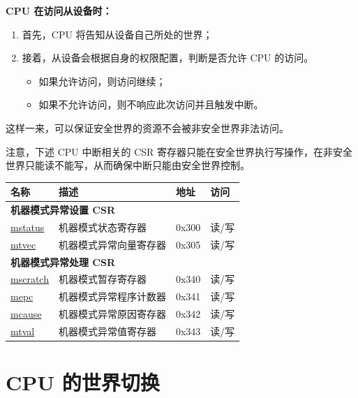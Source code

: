 \documentclass[main\_\_CN.tex]{subfiles}
\begin{document}
\textbf{CPU 在访问从设备时：}

\begin{enumerate}
    \item 首先，CPU 将告知从设备自己所处的世界；
    \item 接着，从设备会根据自身的权限配置，判断是否允许 CPU 的访问。
        \begin{itemize}
        \item 如果允许访问，则访问继续；
        \item 如果不允许访问，则不响应此次访问并且触发中断。
        \end{itemize}
\end{enumerate}
这样一来，可以保证安全世界的资源不会被非安全世界非法访问。

注意，下述 CPU 中断相关的 CSR 寄存器只能在安全世界执行写操作，在非安全世界只能读不能写，从而确保中断只能由安全世界控制。
\begin{table}[H]
    \centering
    \begin{tabular}[c]{ | l | l | l | l | }
    \hline\rowcolor{lightgray}
    \textbf{名称} & \textbf{描述} & \textbf{地址} & \textbf{访问} \\ \hline
    \multicolumn{4}{|l|}{\textbf{机器模式异常设置 CSR}} \\\hline
    \hyperref[regdesc:MSTATUS]{mstatus} & 机器模式状态寄存器 & 0x300 & 读/写 \\\hline
    \hyperref[regdesc:MTVEC]{mtvec}  & 机器模式异常向量寄存器 & 0x305 & 读/写 \\\hline
    \multicolumn{4}{|l|}{\textbf{机器模式异常处理 CSR}} \\\hline
    \hyperref[regdesc:MSCRATCH]{mscratch} & 机器模式暂存寄存器 & 0x340 & 读/写 \\\hline
    \hyperref[regdesc:MEPC]{mepc} & 机器模式异常程序计数器 & 0x341 & 读/写 \\\hline
    \hyperref[regdesc:MCAUSE]{mcause}  & 机器模式异常原因寄存器 & 0x342 & 读/写 \\\hline
    \hyperref[regdesc:MTVAL]{mtval} & 机器模式异常值寄存器 & 0x343 & 读/写 \\\hline
    \end{tabular}
\end{table}


\section{CPU 的世界切换} \label{sec:34-WCTRL-recommended-operation}
\end{document}
